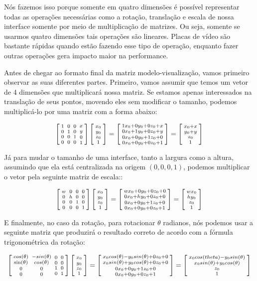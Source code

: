 Nós fazemos isso porque somente em quatro dimensões é possível
representar todas as operações necessárias como a rotação, translação
e escala de nossa interface somente por meio de multiplicação de
matrizes. Ou seja, somente se usarmos quatro dimensões tais operações
são lineares. Placas de vídeo são bastante rápidas quando estão
fazendo esse tipo de operação, enquanto fazer outras operações gera
impacto maior na performance.

Antes de chegar ao formato final da matriz modelo-visualização, vamos
primeiro observar as suas diferentes partes. Primeiro, vamos assumir
que temos um vetor de 4 dimensões que multiplicará nossa matriz. Se
estamos apenas interessados na translação de seus pontos, movendo eles
sem modificar o tamanho, podemos multiplicá-lo por uma matriz com a
forma abaixo:

$$ \left[{{1 \atop 0}\atop {0\atop 0}}{{0 \atop 1}\atop {0 \atop
      0}}{{0\atop 0}\atop{1 \atop 0}}{{x \atop y}\atop{0\atop
      1}}\right]\left[{{x_0\atop y_0}\atop {z_0\atop
      1}}\right]=\left[{{1x_0+0y_0+0z_0+x\atop 0x_0+1y_0+0z_0+y}\atop
    {0x_0+0y_0+1z_0+0\atop
      0x_0+0y_0+0z_0+1}}\right]=\left[{{x_0+x\atop y_0+y}\atop
    {z_0\atop 1}}\right]
$$

Já para mudar o tamanho de uma interface, tanto a largura como a
altura, assumindo que ela está centralizada na origem $(0, 0, 0, 1)$,
podemos multiplicar o vetor pela seguinte matriz de escala::

$$ \left[{{w \atop 0}\atop {0\atop 0}}{{0 \atop h}\atop {0 \atop
      0}}{{0\atop 0}\atop{1 \atop 0}}{{0 \atop 0}\atop{0\atop
      1}}\right]\left[{{x_0\atop y_0}\atop {z_0\atop
      1}}\right]=\left[{{wx_0+0y_0+0z_0+0\atop 0x_0+hy_0+0z_0+0}\atop
    {0x_0+0y_0+1z_0+0\atop 0x_0+0y_0+0z_0+1}}\right]=\left[{{wx_0\atop
      hy_0}\atop {z_0\atop 1}}\right]
$$

E finalmente, no caso da rotação, para rotacionar $\theta$ radianos,
nós podemos usar a seguinte matriz que produzirá o resultado correto
de acordo com a fórmula trigonométrica da rotação:

$$ \left[{{cos(\theta) \atop \sin(\theta)}\atop {0\atop
      0}}{{-sin(\theta) \atop cos(\theta)}\atop {0 \atop 0}}{{0\atop
      0}\atop{1 \atop 0}}{{0 \atop 0}\atop{0\atop
      1}}\right]\left[{{x_0\atop y_0}\atop {z_0\atop
      1}}\right]=\left[{{x_0 cos(\theta)-y_0 sin(\theta)+0z_0+0\atop
      x_0 sin(\theta)+y_0 cos(\theta)+0z_0+0}\atop
    {0x_0+0y_0+1z_0+0\atop 0x_0+0y_0+0z_0+1}}\right]=\left[{{x_0
      cos(theta) - y_0 sin(\theta) \atop x_0 sin(\theta) + y_0
      cos(\theta)}\atop {z_0\atop 1}}\right]
$$

